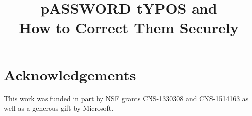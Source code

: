 \documentclass[conference]{IEEEtran}
\begin{document}



\title{pASSWORD tYPOS and \\ How to Correct Them Securely}

\author{ 
  
}

\makeatletter
\let\@copyrightspace\relax
\makeatother




\maketitle
\thispagestyle{plain}
\pagestyle{plain}
 




%


%

%



\section*{Acknowledgements}

This work was funded in part by NSF grants CNS-1330308 and CNS-1514163 as well
as a generous gift by Microsoft.

%



\appendix

%
%
%
%
%
\end{document}
